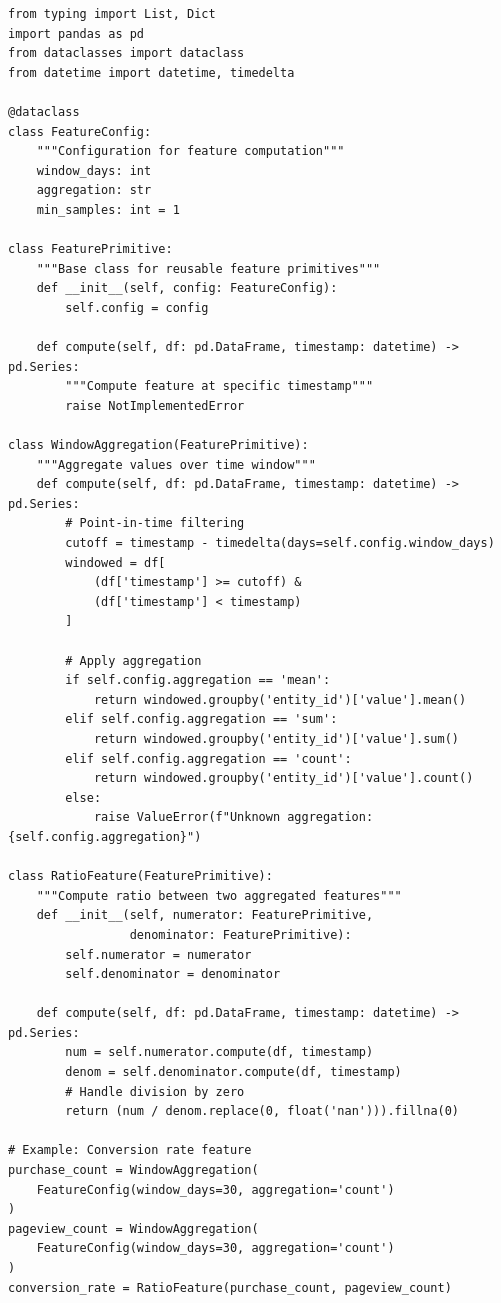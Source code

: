 \begin{lstlisting}[style=python, caption=Modular feature composition]
from typing import List, Dict
import pandas as pd
from dataclasses import dataclass
from datetime import datetime, timedelta

@dataclass
class FeatureConfig:
    """Configuration for feature computation"""
    window_days: int
    aggregation: str
    min_samples: int = 1

class FeaturePrimitive:
    """Base class for reusable feature primitives"""
    def __init__(self, config: FeatureConfig):
        self.config = config

    def compute(self, df: pd.DataFrame, timestamp: datetime) -> pd.Series:
        """Compute feature at specific timestamp"""
        raise NotImplementedError

class WindowAggregation(FeaturePrimitive):
    """Aggregate values over time window"""
    def compute(self, df: pd.DataFrame, timestamp: datetime) -> pd.Series:
        # Point-in-time filtering
        cutoff = timestamp - timedelta(days=self.config.window_days)
        windowed = df[
            (df['timestamp'] >= cutoff) &
            (df['timestamp'] < timestamp)
        ]

        # Apply aggregation
        if self.config.aggregation == 'mean':
            return windowed.groupby('entity_id')['value'].mean()
        elif self.config.aggregation == 'sum':
            return windowed.groupby('entity_id')['value'].sum()
        elif self.config.aggregation == 'count':
            return windowed.groupby('entity_id')['value'].count()
        else:
            raise ValueError(f"Unknown aggregation: {self.config.aggregation}")

class RatioFeature(FeaturePrimitive):
    """Compute ratio between two aggregated features"""
    def __init__(self, numerator: FeaturePrimitive,
                 denominator: FeaturePrimitive):
        self.numerator = numerator
        self.denominator = denominator

    def compute(self, df: pd.DataFrame, timestamp: datetime) -> pd.Series:
        num = self.numerator.compute(df, timestamp)
        denom = self.denominator.compute(df, timestamp)
        # Handle division by zero
        return (num / denom.replace(0, float('nan'))).fillna(0)

# Example: Conversion rate feature
purchase_count = WindowAggregation(
    FeatureConfig(window_days=30, aggregation='count')
)
pageview_count = WindowAggregation(
    FeatureConfig(window_days=30, aggregation='count')
)
conversion_rate = RatioFeature(purchase_count, pageview_count)
\end{lstlisting}

